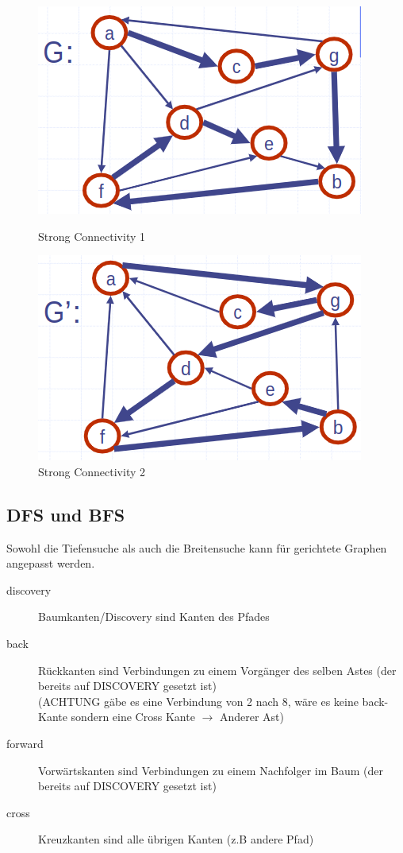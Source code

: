 \begin{figure}[ht!]
	\centering
	\begin{minipage}[t]{0.4\textwidth}
		\centering
		\includegraphics[width=0.7\linewidth]{images/g}
		\caption{Strong Connectivity 1}
		\label{fig:strongconnect1}
	\end{minipage}
	\centering
	\begin{minipage}[t]{0.4\textwidth}
		\centering
		\includegraphics[width=0.7\linewidth]{images/gstrich}
		\caption{Strong Connectivity 2}
		\label{fig:strongconnect2}
	\end{minipage}
\end{figure}

\clearpage

\subsection{DFS und BFS}
Sowohl die Tiefensuche als auch die Breitensuche kann für gerichtete Graphen angepasst werden.
\begin{description}
	\item[discovery] Baumkanten/Discovery sind Kanten des Pfades
	\item[back] Rückkanten sind Verbindungen zu einem Vorgänger des selben Astes (der bereits auf DISCOVERY gesetzt ist) \\
	(ACHTUNG gäbe es eine Verbindung von 2 nach 8, wäre es keine back-Kante sondern eine Cross Kante $\rightarrow$ Anderer Ast)
	\item[forward] Vorwärtskanten sind Verbindungen zu einem Nachfolger im Baum (der bereits auf DISCOVERY gesetzt ist)
	\item[cross] Kreuzkanten sind alle übrigen Kanten (z.B andere Pfad)
\end{description}

